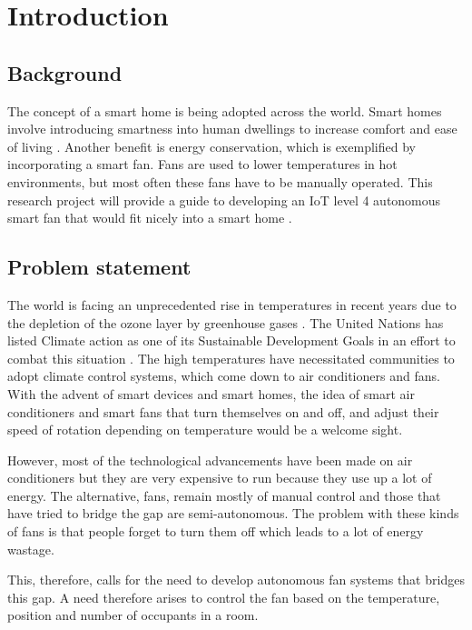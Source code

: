 \section{Introduction}
\label{sec:introduction}
\subsection{Background}

The concept of a smart home is being adopted across the world. Smart homes involve introducing smartness into human dwellings to increase comfort and ease of living \cite{lashkari_energy_2019}. Another benefit is energy conservation, which is exemplified by incorporating a smart fan. Fans are used to lower temperatures in hot environments, but most often these fans have to be manually operated. This research project will provide a guide to developing an IoT level 4 autonomous smart fan that would fit nicely into a smart home \cite{rana_connected_2021}.

\subsection{Problem statement}

The world is facing an unprecedented rise in temperatures in recent years due to the depletion of the ozone layer by greenhouse gases \cite{noauthor_new_nodate}. The United Nations has listed Climate action as one of its Sustainable Development Goals in an effort to combat this situation \cite{noauthor_goal_nodate}. The high temperatures have necessitated communities to adopt climate control systems, which come down to air conditioners and fans. With the advent of smart devices and smart homes, the idea of smart air conditioners and smart fans that turn themselves on and off, and adjust their speed of rotation depending on temperature would be a welcome sight.
\par
However, most of the technological advancements have been made on air conditioners but they are very expensive to run because they use up a lot of energy. The alternative, fans, remain mostly of manual control and those that have tried to bridge the gap are semi-autonomous. The problem with these kinds of fans is that people forget to turn them off which leads to a lot of energy wastage.
\par
This, therefore, calls for the need to develop autonomous fan systems that bridges this gap. A need therefore arises to control the fan based on the temperature, position and number of occupants in a room.


